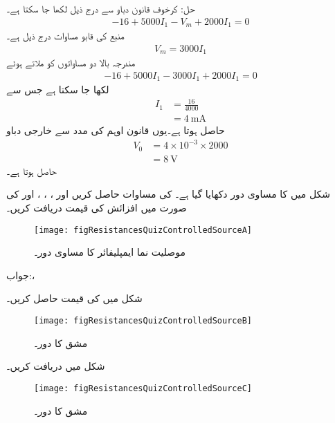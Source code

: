 حل: کرخوف قانون دباو سے درج ذیل لکھا جا سکتا ہے۔
\begin{align*}
-16+5000 I_1-V_m+2000 I_1=0
\end{align*}
منبع کی قابو مساوات درج ذیل ہے۔
\begin{align*}
V_m=3000I_1
\end{align*}
مندرجہ بالا دو مساواتوں کو ملاتے ہوئے
\begin{align*}
-16+5000 I_1-3000I_1+2000 I_1=0
\end{align*}
لکھا جا سکتا ہے جس سے
\begin{align*}
I_1&=\frac{16}{4000}\\
&=\SI{4}{\milli\ampere}
\end{align*}
حاصل ہوتا ہے۔یوں قانون اوہم کی مدد سے خارجی دباو
\begin{align*}
V_0&=4\times 10^{-3} \times 2000\\
&=\SI{8}{\volt}
\end{align*}
حاصل ہوتا ہے۔

شکل  میں  کا مساوی دور دکھایا گیا ہے۔  کی مساوات حاصل کریں اور ، ، ،  اور  کی صورت میں افزائش کی قیمت دریافت کریں۔
\begin{figure}
\centering
\texttt{[image: figResistancesQuizControlledSourceA]}
\caption{موصلیت نما ایمپلیفائر کا مساوی دور۔}
\label{شکل_مزاحمتی-مشق_تابع_الف}
\end{figure}

جواب:، 

شکل  میں  کی قیمت حاصل کریں۔
\begin{figure}
\centering
\texttt{[image: figResistancesQuizControlledSourceB]}
\caption{مشق  کا دور۔}
\label{شکل_مزاحمتی-مشق_تابع_ب}
\end{figure}

شکل  میں  دریافت کریں۔
\begin{figure}
\centering
\texttt{[image: figResistancesQuizControlledSourceC]}
\caption{مشق  کا دور۔}
\label{شکل_مزاحمتی-مشق_تابع_پ}
\end{figure}


